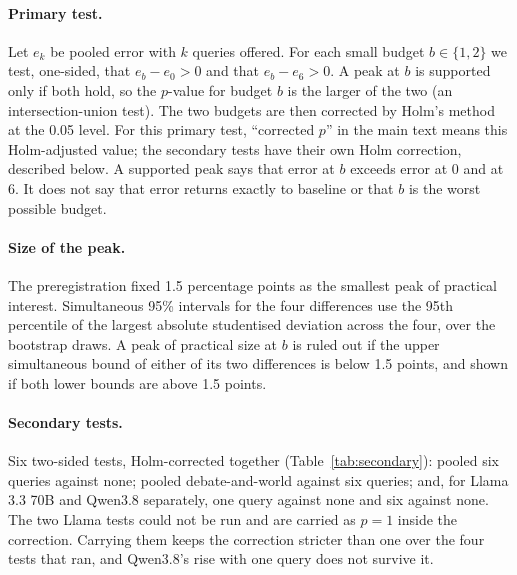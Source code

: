 \paragraph{Primary test.} Let $e_k$ be pooled error with $k$ queries offered. For each small budget $b \in \{1, 2\}$
we test, one-sided, that $e_b - e_0 > 0$ and that $e_b - e_6 > 0$. A peak at $b$ is supported only if both hold, so
the $p$-value for budget $b$ is the larger of the two (an intersection-union test). The two budgets are then
corrected by Holm's method at the 0.05 level. For this primary test, ``corrected $p$'' in the main text means this
Holm-adjusted value; the secondary tests have their own Holm correction, described below.
A supported peak says that error at $b$ exceeds error at 0 and at 6. It does not say that error returns exactly to
baseline or that $b$ is the worst possible budget.

\paragraph{Size of the peak.} The preregistration fixed 1.5 percentage points as the smallest peak of practical
interest. Simultaneous 95\% intervals for the four differences use the 95th percentile of the largest absolute
studentised deviation across the four, over the bootstrap draws. A peak of practical size at $b$ is ruled out if the
upper simultaneous bound of either of its two differences is below 1.5 points, and shown if both lower bounds are
above 1.5 points.

\begin{table}[h]
\centering
\caption{The four registered differences, seven judges, in percentage points. Holm-corrected $p$: \pHolmOne{} for
one query and \pHolmTwo{} for two.}
\label{tab:primaryfull}
\small

\end{table}

\paragraph{Secondary tests.} Six two-sided tests, Holm-corrected together (Table~\ref{tab:secondary}): pooled six
queries against none; pooled debate-and-world against six queries; and, for Llama 3.3 70B and Qwen3.8 separately, one
query against none and six against none. The two Llama tests could not be run and are carried as $p = 1$ inside the
correction. Carrying them keeps the correction stricter than one over the four tests that ran, and Qwen3.8's rise
with one query does not survive it.

